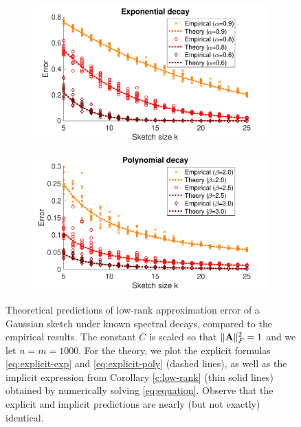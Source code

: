 \documentclass[../../thesis.tex]{subfiles}
\begin{document}
\begin{figure}[t]
  \centering
  \begin{subfigure}{0.49\textwidth}%
    \includegraphics[width=\textwidth]{explicit_exp}
  \end{subfigure}
  \hfill
  \begin{subfigure}{0.49\textwidth}%
    \includegraphics[width=\textwidth]{explicit_poly}
  \end{subfigure}
  \caption{
    Theoretical predictions of low-rank approximation error of a Gaussian
    sketch under known spectral decays, compared to the empirical results.
    The constant $C$ is scaled so that $\|\mathbf A\|_F^2=1$ and we let
    $n=m=1000$. For the theory, we plot the explicit formulas
    \eqref{eq:explicit-exp} and \eqref{eq:explicit-poly} (dashed lines),
    as well as the implicit expression from Corollary \ref{c:low-rank}
    (thin solid lines) obtained by numerically solving
    \eqref{eq:equation}. Observe that the explicit and implicit
    predictions are nearly (but not exactly) identical.
  }
  \label{f:explicit}
\end{figure}
\end{document}
